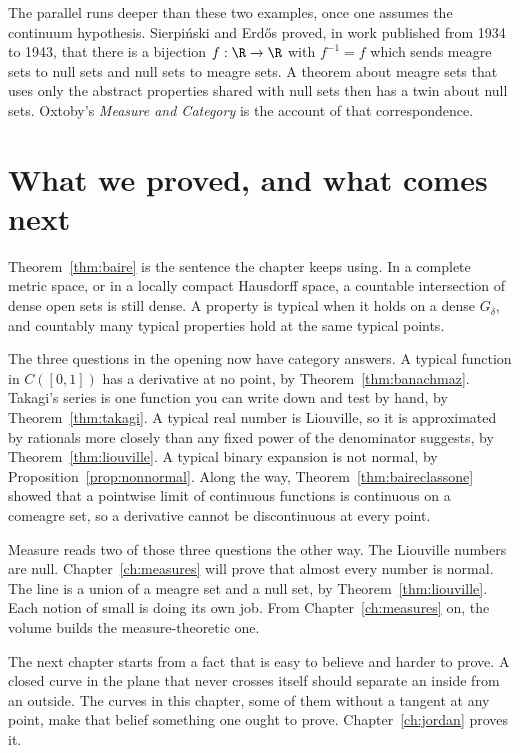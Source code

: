 \begin{remark}
The parallel runs deeper than these two examples, once one assumes the continuum hypothesis. Sierpi\'nski and Erd\H{o}s proved, in work published from 1934 to 1943, that there is a bijection $f:\R\to\R$ with $f^{-1}=f$ which sends meagre sets to null sets and null sets to meagre sets. A theorem about meagre sets that uses only the abstract properties shared with null sets then has a twin about null sets. Oxtoby's \emph{Measure and Category} is the account of that correspondence.
\end{remark}

\section{What we proved, and what comes next}

Theorem~\ref{thm:baire} is the sentence the chapter keeps using. In a complete metric space, or in a locally compact Hausdorff space, a countable intersection of dense open sets is still dense. A property is typical when it holds on a dense $G_\delta$, and countably many typical properties hold at the same typical points.

The three questions in the opening now have category answers. A typical function in $C([0,1])$ has a derivative at no point, by Theorem~\ref{thm:banachmaz}. Takagi's series is one function you can write down and test by hand, by Theorem~\ref{thm:takagi}. A typical real number is Liouville, so it is approximated by rationals more closely than any fixed power of the denominator suggests, by Theorem~\ref{thm:liouville}. A typical binary expansion is not normal, by Proposition~\ref{prop:nonnormal}. Along the way, Theorem~\ref{thm:baireclassone} showed that a pointwise limit of continuous functions is continuous on a comeagre set, so a derivative cannot be discontinuous at every point.

Measure reads two of those three questions the other way. The Liouville numbers are null. Chapter~\ref{ch:measures} will prove that almost every number is normal. The line is a union of a meagre set and a null set, by Theorem~\ref{thm:liouville}. Each notion of small is doing its own job. From Chapter~\ref{ch:measures} on, the volume builds the measure-theoretic one.

The next chapter starts from a fact that is easy to believe and harder to prove. A closed curve in the plane that never crosses itself should separate an inside from an outside. The curves in this chapter, some of them without a tangent at any point, make that belief something one ought to prove. Chapter~\ref{ch:jordan} proves it.

